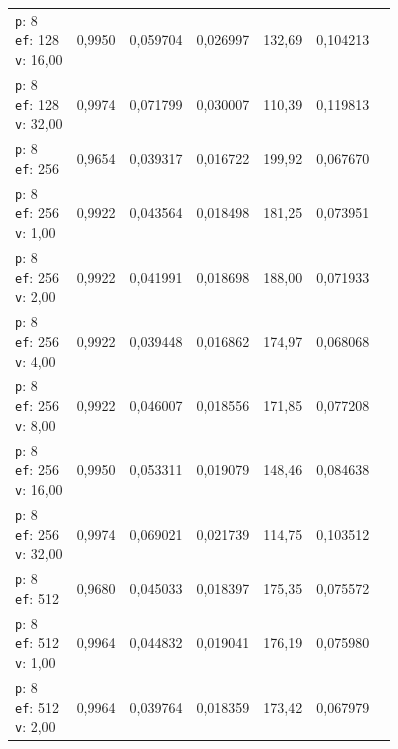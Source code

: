\begin{table}[htbp]
\begin{tabularx}{\textwidth}{Xrrrrrr}
    \makecell{\texttt{p}: 8\\\texttt{ef}: 128\\\texttt{v}: 16,00} & 0,9950 & 0,059704 & 0,026997 & 132,69 & 0,104213 \\
    \makecell{\texttt{p}: 8\\\texttt{ef}: 128\\\texttt{v}: 32,00} & 0,9974 & 0,071799 & 0,030007 & 110,39 & 0,119813 \\
    \makecell{\texttt{p}: 8\\\texttt{ef}: 256} & 0,9654 & 0,039317 & 0,016722 & 199,92 & 0,067670 \\
    \makecell{\texttt{p}: 8\\\texttt{ef}: 256\\\texttt{v}: 1,00} & 0,9922 & 0,043564 & 0,018498 & 181,25 & 0,073951 \\
    \makecell{\texttt{p}: 8\\\texttt{ef}: 256\\\texttt{v}: 2,00} & 0,9922 & 0,041991 & 0,018698 & 188,00 & 0,071933 \\
    \makecell{\texttt{p}: 8\\\texttt{ef}: 256\\\texttt{v}: 4,00} & 0,9922 & 0,039448 & 0,016862 & 174,97 & 0,068068 \\
    \makecell{\texttt{p}: 8\\\texttt{ef}: 256\\\texttt{v}: 8,00} & 0,9922 & 0,046007 & 0,018556 & 171,85 & 0,077208 \\
    \makecell{\texttt{p}: 8\\\texttt{ef}: 256\\\texttt{v}: 16,00} & 0,9950 & 0,053311 & 0,019079 & 148,46 & 0,084638 \\
    \makecell{\texttt{p}: 8\\\texttt{ef}: 256\\\texttt{v}: 32,00} & 0,9974 & 0,069021 & 0,021739 & 114,75 & 0,103512 \\
    \makecell{\texttt{p}: 8\\\texttt{ef}: 512} & 0,9680 & 0,045033 & 0,018397 & 175,35 & 0,075572 \\
    \makecell{\texttt{p}: 8\\\texttt{ef}: 512\\\texttt{v}: 1,00} & 0,9964 & 0,044832 & 0,019041 & 176,19 & 0,075980 \\
    \makecell{\texttt{p}: 8\\\texttt{ef}: 512\\\texttt{v}: 2,00} & 0,9964 & 0,039764 & 0,018359 & 173,42 & 0,067979 \\

\end{tabularx}
\end{table}
